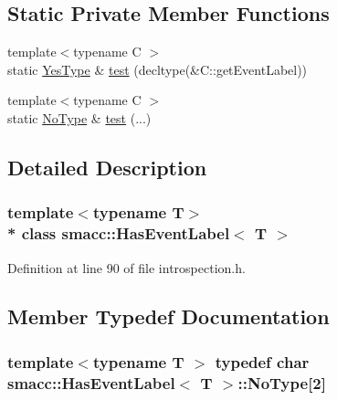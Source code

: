 \subsection*{Static Private Member Functions}
\begin{DoxyCompactItemize}
\item 
{\footnotesize template$<$typename C $>$ }\\static \hyperlink{classsmacc_1_1HasEventLabel_a7baf4f99540d64553d8bba388b77fb25}{Yes\+Type} \& \hyperlink{classsmacc_1_1HasEventLabel_a346a72be8e0086abda1883e85e6f2d5d}{test} (decltype(\&C\+::get\+Event\+Label))
\item 
{\footnotesize template$<$typename C $>$ }\\static \hyperlink{classsmacc_1_1HasEventLabel_a95929e58f14e06acf98ddcb5dec21f6b}{No\+Type} \& \hyperlink{classsmacc_1_1HasEventLabel_a723ffed00dc749921201a23607a90964}{test} (...)
\end{DoxyCompactItemize}


\subsection{Detailed Description}
\subsubsection*{template$<$typename T$>$\\*
class smacc\+::\+Has\+Event\+Label$<$ T $>$}



Definition at line 90 of file introspection.\+h.



\subsection{Member Typedef Documentation}
\subsubsection[{\texorpdfstring{No\+Type}{NoType}}]{\setlength{\rightskip}{0pt plus 5cm}template$<$typename T $>$ typedef char {\bf smacc\+::\+Has\+Event\+Label}$<$ T $>$\+::No\+Type\mbox{[}2\mbox{]}\hspace{0.3cm}{\ttfamily [private]}}\hypertarget{classsmacc_1_1HasEventLabel_a95929e58f14e06acf98ddcb5dec21f6b}{}\label{classsmacc_1_1HasEventLabel_a95929e58f14e06acf98ddcb5dec21f6b}


